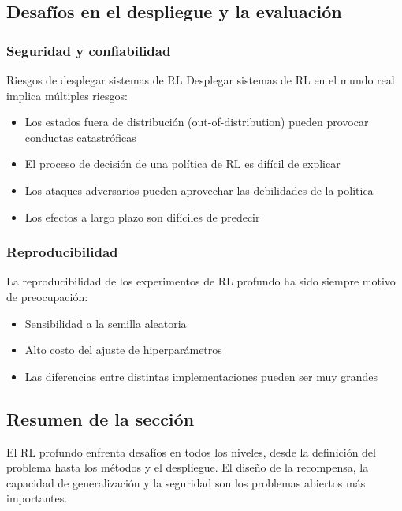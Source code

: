 \subsection{Desafíos en el despliegue y la evaluación}

\subsubsection{Seguridad y confiabilidad}

\begin{warningbox}{Riesgos de desplegar sistemas de RL}
Desplegar sistemas de RL en el mundo real implica múltiples riesgos:
\begin{itemize}
    \item Los estados fuera de distribución (out-of-distribution) pueden provocar conductas catastróficas
    \item El proceso de decisión de una política de RL es difícil de explicar
    \item Los ataques adversarios pueden aprovechar las debilidades de la política
    \item Los efectos a largo plazo son difíciles de predecir
\end{itemize}
\end{warningbox}

\subsubsection{Reproducibilidad}

La reproducibilidad de los experimentos de RL profundo ha sido siempre motivo de preocupación:
\begin{itemize}
    \item Sensibilidad a la semilla aleatoria
    \item Alto costo del ajuste de hiperparámetros
    \item Las diferencias entre distintas implementaciones pueden ser muy grandes
\end{itemize}

\subsection{Resumen de la sección}

El RL profundo enfrenta desafíos en todos los niveles, desde la definición del problema hasta los métodos y el despliegue. El diseño de la recompensa, la capacidad de generalización y la seguridad son los problemas abiertos más importantes.
